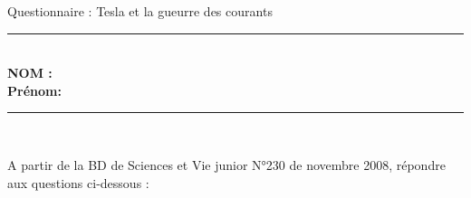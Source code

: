 \documentclass[11pt,a4paper]{article}
\begin{document}
\begin{center}
\vspace{-3mm}
\LARGE{Questionnaire : Tesla et la gueurre des courants} \\

\vspace{2mm}

\normalsize
\hline

\hrule\
\\[0,2cm]

\flushleft \textbf{NOM :\\[4mm]
Prénom:\\[0,2cm]
}
\hrule\
\\[0,2cm]


\normalsize
\end{center}

\vspace{2mm}

A partir de la BD de Sciences et Vie junior N°230 de novembre 2008, répondre aux questions ci-dessous : 
\end{document}
